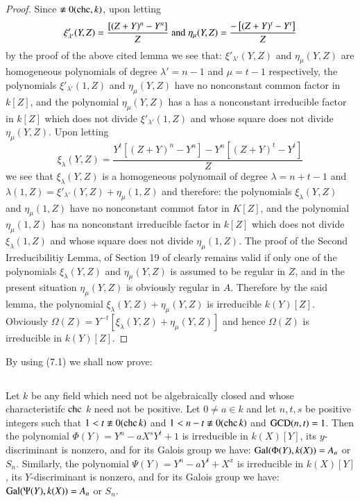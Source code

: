 \begin{proof}
Since $\nequiv 0(\chc, k)$, upon letting
$$
\xi'_{\lambda'}(Y,Z)=\dfrac{\left[(Z+Y)^n-Y^{n}\right]}{Z} \; {\rm and}\; \eta_{\mu}(Y,Z)=\dfrac{-\left[(Z+Y)^t-Y^{t}\right]}{Z}
$$
by the proof of the above cited lemma we see that: $\xi'_{\lambda'}(Y,Z)$ and $\eta_{\mu}(Y,Z)$ are homogeneous polynomials of degree $\lambda'=n-1$ and $\mu = t-1$ respectively, the polynomials $\xi'_{\lambda'}(1,Z)$ and $\eta_{\mu}(Y,Z)$ have no nonconstant common factor in $k[Z]$, and the polynomial $\eta_{\mu}(Y,Z)$ has a has a nonconstant irreducible factor in $k[Z]$ which does not divide $\xi'_{\lambda'}(1,Z)$ and whose square does not divide $\eta_{\mu}(Y,Z)$. Upon letting 
$$
\xi_{\lambda}(Y,Z)=\dfrac{Y^{t}\left[(Z+Y)^{n}-Y^{n}\right]-Y^{n}\left[(Z+Y)^{t}-Y^{t}\right]}{Z}
$$
we see that $\xi_{\lambda}(Y,Z)$ is a homogeneous polynomail of degree $\lambda =n+t-1$ and $\lambda(1,Z)= \xi'_{\lambda'}(Y,Z)+\eta_{\mu}(1,Z)$ and therefore: the polynomials $\xi_{\lambda}(Y,Z)$ and $\eta_{\mu}(1,Z)$ have no  nonconstant commot fator in $K[Z]$, and the polynomial $\eta_{\mu}(1,Z)$ has na nonconstant irreducible factor in $k[Z]$ which does not divide $\xi_{\lambda}(1,Z)$ and whose square does not divide $\eta_{\mu}(1,Z)$. The proof of the Second Irreducibilitiy Lemma, of Section 19 of \cite{chap1-key8} clearly remains valid if only one of the polynomials $\xi_{\lambda}(Y,Z)$ and $\eta_{\mu}(Y,Z)$ is assumed to be regular in $Z$, and in the present situation $\eta_{\mu}(Y,Z)$ is obviously regular in $A$. Therefore by the said lemma, the polynomial $\xi_{\lambda}(Y,Z) + \eta_{\mu}(Y,Z)$  is irreducible $k(Y)[Z]$. Obviously $\Omega(Z)=Y^{-t}\left[\xi_{\lambda}(Y,Z) + \eta_{\mu}(Y,Z)\right]$ and hence $\Omega(Z)$ is irreducible in $k(Y)[Z]$.
\end{proof}
By using (7.1) we shall now prove:

\subsection{}

Let $k$ be any field which need not be algebraically closed and whose characteristifc $\operatorname{chc}$ $k$  need not be positive. Let $0 \neq a\in k$ and let $n, t, s$ be positive integers such that $1 < t\nequiv 0(\chc k)$ and $1 < n-t \nequiv 0(\chc k)$ and $\operatorname{GCD}(n, t) =1$. Then the polynomial $\Phi(Y)=Y^{n}-aX^{s}Y^{t}+1$ is irreducible in $k(X)[Y]$, its $y$-discriminant is nonzero, and for its Galois group we have: $\operatorname{Gal}(\Phi(Y), k(X))=A_{n}$ or $S_{n}$. Similarly, the polynomial $\Psi(Y)=Y^{n}-aY^{t}+X^{x}$ is irreducible in $k(X)[Y]$, its $Y$-discriminant is nonzero, and for its Galois group we have: $\operatorname{Gal}(\Psi(Y), k(X))=A_{n}$ or $S_{n}$.

